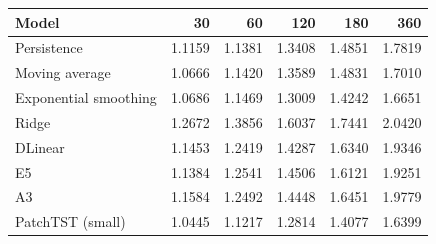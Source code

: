 \begin{tabular}{lrrrrr}
\toprule
Model & 30 & 60 & 120 & 180 & 360 \\
\midrule
Persistence & 1.1159 & 1.1381 & 1.3408 & 1.4851 & 1.7819 \\
Moving average & 1.0666 & 1.1420 & 1.3589 & 1.4831 & 1.7010 \\
Exponential smoothing & 1.0686 & 1.1469 & 1.3009 & 1.4242 & 1.6651 \\
Ridge & 1.2672 & 1.3856 & 1.6037 & 1.7441 & 2.0420 \\
DLinear & 1.1453 & 1.2419 & 1.4287 & 1.6340 & 1.9346 \\
E5 & 1.1384 & 1.2541 & 1.4506 & 1.6121 & 1.9251 \\
A3 & 1.1584 & 1.2492 & 1.4448 & 1.6451 & 1.9779 \\
PatchTST (small) & 1.0445 & 1.1217 & 1.2814 & 1.4077 & 1.6399 \\
\bottomrule
\end{tabular}
